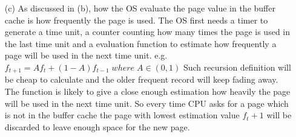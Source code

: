 \documentclass[10pt,twoside,a4paper]{article}
\begin{document}
\begin{itemize}
\item[(c)]
As discussed in (b), how the OS evaluate the page value in the buffer cache is how frequently the page is used. The OS first needs a timer to generate a time unit, a counter counting how many times the page is used in the last time unit and a evaluation function to estimate how frequently a page will be used in the next time unit. e.g. $f_{t+1} = Af_t + (1-A)f_{t-1}\;where\; A\in (0,1)$ Such recursion definition will be cheap to calculate and the older frequent record will keep fading away. The function is likely to give a close enough estimation how heavily the page will be used in the next time unit. So every time CPU asks for a page which is not in the buffer cache the page with lowest estimation value $f_t+1$ will be discarded to leave enough space for the new page.

\end{itemize}
\end{document}
